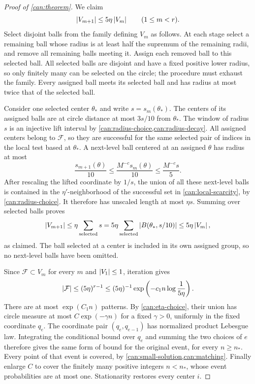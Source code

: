 \begin{proof}[Proof of \cref{can:theorem}]
We claim
\begin{equation}\label{can:cover-contraction}
\left\lvert V_{m+1}\right\rvert\le5\eta\left\lvert V_m\right\rvert\qquad(1\le m<r).
\end{equation}
Select disjoint balls from the family defining $V_m$ as follows.  At each
stage select a remaining ball whose radius is at least half the
supremum of the remaining radii, and remove all remaining balls meeting
it.  Assign each removed ball to this selected ball.  All selected balls
are disjoint and have a fixed positive lower radius, so only finitely
many can be selected on the circle; the procedure must exhaust the
family.  Every assigned ball meets its selected ball and has radius at
most twice that of the selected ball.

Consider one selected center $\theta_*$ and write
$s=s_m(\theta_*)$.  The centers of its assigned balls are at circle
distance at most $3s/10$ from $\theta_*$.  The window of radius $s$ is
an injective lift interval by \cref{can:radius-choice,can:radius-decay}.
All assigned centers belong to $\mathcal F$, so they are successful for
the same selected pair of indices in the local test based at
$\theta_*$.  A next-level ball centered at an assigned $\theta$ has
radius at most
\[
\frac{s_{m+1}(\theta)}{10}
\le \frac{M^{-c}s_m(\theta)}{10}
\le \frac{M^{-c}s}{5}.
\]
After rescaling the lifted coordinate by $1/s$, the union of all these
next-level balls is contained in the $\eta'$-neighborhood of the
successful set in \cref{can:local-scarcity}, by
\cref{can:radius-choice}.  It therefore has unscaled length at most
$\eta s$.  Summing over selected balls proves
\[
\left\lvert V_{m+1}\right\rvert\le\eta\sum_{\text{selected}}s
=5\eta\sum_{\text{selected}}
  \left\lvert B(\theta_*,s/10)\right\rvert
\le5\eta\left\lvert V_m\right\rvert,
\]
as claimed.  The ball selected at a center is included in its own
assigned group, so no next-level balls have been omitted.

Since $\mathcal F\subset V_m$ for every $m$ and $\left\lvert V_1\right\rvert\le1$,
iteration gives
\[
\left\lvert\mathcal F\right\rvert\le(5\eta)^{r-1}
\le(5\eta)^{-1}
  \exp\left(-c_1n\log\frac1{5\eta}\right).
\]
There are at most $\exp(C_1n)$ patterns.  By
\cref{can:eta-choice}, their union has circle measure at most
$C\exp(-\gamma n)$ for a fixed $\gamma>0$, uniformly in the fixed
coordinate $q_e$.  The coordinate pair $(q_e,q_{e-1})$ has normalized
product Lebesgue law.  Integrating the conditional bound over $q_e$ and
summing the two choices of $e$ therefore gives the same form of bound
for the original event, for every $n\ge n_*$.  Every point of that event
is covered, by \cref{can:small-solution,can:matching}.  Finally enlarge
$C$ to cover the finitely many positive integers $n<n_*$, whose event
probabilities are at most one.  Stationarity restores every center $i$.
\end{proof}
